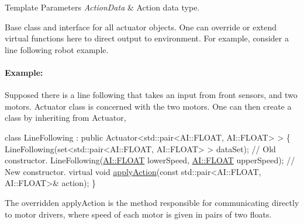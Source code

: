 \begin{DoxyTemplParams}{Template Parameters}
{\em Action\-Data} & Action data type.\\
\hline
\end{DoxyTemplParams}
Base class and interface for all actuator objects. One can override or extend virtual functions here to direct output to environment. For example, consider a line following robot example.

\paragraph*{Example\-:}

Supposed there is a line following that takes an input from front sensors, and two motors. Actuator class is concerned with the two motors. One can then create a class by inheriting from Actuator,


\begin{DoxyCode}
\textcolor{keyword}{class }LineFollowing : \textcolor{keyword}{public} Actuator<std::pair<AI::FLOAT, AI::FLOAT> > \{
   LineFollowing(set<std::pair<AI::FLOAT, AI::FLOAT> > dataSet);  \textcolor{comment}{// Old constructor.}
   LineFollowing(\hyperlink{namespaceAI_a41b74884a20833db653dded3918e05c3}{AI::FLOAT} lowerSpeed, \hyperlink{namespaceAI_a41b74884a20833db653dded3918e05c3}{AI::FLOAT} upperSpeed);  \textcolor{comment}{// New constructor.}
   \textcolor{keyword}{virtual} \textcolor{keywordtype}{void} \hyperlink{classAI_1_1ActuatorBase_aecd4ee9cf0e33633c1c48028b4cb89a1}{applyAction}(\textcolor{keyword}{const} std::pair<AI::FLOAT, AI::FLOAT>& action);
\}
\end{DoxyCode}


The overridden apply\-Action is the method responsible for communicating directly to motor drivers, where speed of each motor is given in pairs of two floats. 

